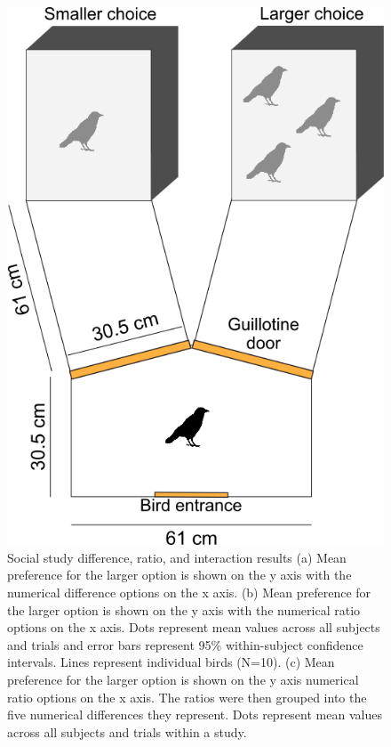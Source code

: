 \documentclass[
  ,doc,floatsintext]{apa6}
\begin{document}
\begin{figure}

{\centering \includegraphics[width=1\linewidth]{../figures/social_apparatus} 

}

\caption{Social study difference, ratio, and interaction results (a) Mean preference for the larger option is shown on the y axis with the numerical difference options on the x axis. (b) Mean preference for the larger option is shown on the y axis with the numerical ratio options on the x axis. Dots represent mean values across all subjects and trials and error bars represent 95\% within-subject confidence intervals. Lines represent individual birds (N=10). (c) Mean preference for the larger option is shown on the y axis numerical ratio options on the x axis. The ratios were then grouped into the five numerical differences they represent. Dots represent mean values across all subjects and trials within a study.}\label{fig:socialgraphs}
\end{figure}
\end{document}
